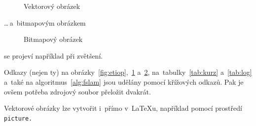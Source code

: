 \documentclass[a4paper, 11pt]{article}
\begin{document}
\begin{figure}[h]
	\centering

	\caption{Vektorový obrázek}
	\label{fig:oniisan}
\end{figure}
\bigskip

\noindent
\dots\,a~bitmapovým obrázkem

\begin{figure}[h]
	\centering

	\caption{Bitmapový obrázek}
	\label{fig:oniisan2}
\end{figure}
\bigskip

\noindent
se projeví například při zvětšení.

Odkazy (nejen ty) na obrázky~\ref{fig:etiop},~\ref{fig:oniisan}
a~\ref{fig:oniisan2}, na~tabulky~\ref{tab:kurz} a~\ref{tab:log} a~také
na algoritmus~\ref{alg:fslam} jsou udělány pomocí křížových odkazů. Pak je
ovšem potřeba zdrojový soubor přeložit dvakrát.

Vektorové obrázky lze vytvořit i~přímo v~\LaTeX{}u, například pomocí
prostředí\texttt{ picture.}

\pagebreak
\bigskip
\end{document}
